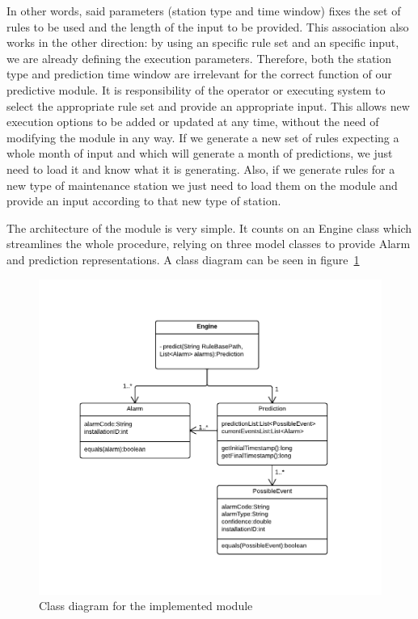 In other words, said parameters (station type and time window) fixes the set of rules to be used and the length of the input to be provided. This association also works in the other direction: by using an specific rule set and an specific input, we are already defining the execution parameters. Therefore, both the station type and prediction time window are irrelevant for the correct function of our predictive module. It is responsibility of the operator or executing system to select the appropriate rule set and provide an appropriate input. This allows new execution options to be added or updated at any time, without the need of modifying the module in any way. If we generate a new set of rules expecting a whole month of input and which will generate a month of predictions, we just need to load it and know what it is generating. Also, if we generate rules for a new type of maintenance station we just need to load them on the module and provide an input according to that new type of station.

The architecture of the module is very simple. It counts on an Engine class which streamlines the whole procedure, relying on three model classes to provide Alarm and prediction representations. A class diagram can be seen in figure~\ref{fig:prototypeArchitecture}

\begin{figure}[hbtp]
\includegraphics[width=\textwidth]{img/prototypeArchitecture.pdf}
\caption{Class diagram for the implemented module} \label{fig:prototypeArchitecture}
\end{figure}

